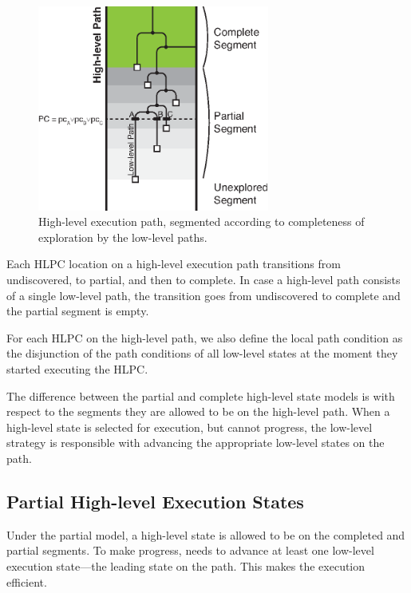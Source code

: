 \begin{figure}
  \centering
  \includegraphics[width=3in]{figures/chef/path-segments}
  \caption{High-level execution path, segmented according to completeness of exploration by the low-level paths.}
  \label{fig:chef:path-segments}
\end{figure}


Each HLPC location on a high-level execution path transitions from undiscovered, to partial, and then to complete.
%
In case a high-level path consists of a single low-level path, the transition goes from undiscovered to complete and the partial segment is empty.

For each HLPC on the high-level path, we also define the local path condition as the disjunction of the path conditions of all low-level states at the moment they started executing the HLPC.

The difference between the partial and complete high-level state models is with respect to the segments they are allowed to be on the high-level path.
%
When a high-level state is selected for execution, but cannot progress, the low-level strategy is responsible with advancing the appropriate low-level states on the path.


\subsection{Partial High-level Execution States}

Under the partial model, a high-level state is allowed to be on the completed and partial segments.
%
To make progress, \chef needs to advance at least one low-level execution state---the leading state on the path.  This makes the execution efficient.

